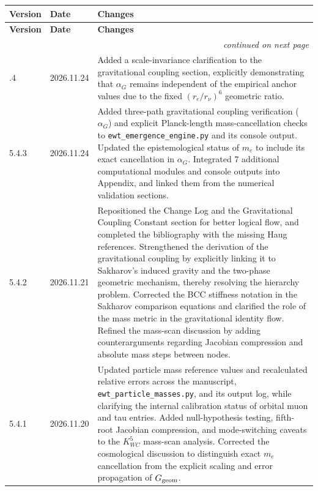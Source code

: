 \documentclass[10pt,a4paper]{article}
\begin{document}
\begin{longtable}{@{}p{1.6cm}p{1.8cm}p{10.1cm}@{}}
	\toprule
	\textbf{Version} & \textbf{Date} & \textbf{Changes} \\
	\midrule
	\endfirsthead
	
	\toprule
	\textbf{Version} & \textbf{Date} & \textbf{Changes} \\
	\midrule
	\endhead
	
	\midrule
	\multicolumn{3}{r}{\small\textit{continued on next page}} \\
	\endfoot
	
	\bottomrule
	\endlastfoot
	5.4.4 & 2026.11.24 &
	Added a scale-invariance clarification to the gravitational coupling section, explicitly demonstrating that \(\alpha_G\) remains independent of the empirical anchor values due to the fixed \((r_e/r_\nu)^6\) geometric ratio. \\
	5.4.3 & 2026.11.24 &
	Added three-path gravitational coupling verification (\(\alpha_G\)) and explicit Planck-length mass-cancellation checks to \texttt{ewt\_emergence\_engine.py} and its console output. Updated the epistemological status of \(m_e\) to include its exact cancellation in \(\alpha_G\). Integrated 7 additional computational modules and console outputs into Appendix, and linked them from the numerical validation sections.\\
	5.4.2 & 2026.11.21 &
	Repositioned the Change Log and the Gravitational Coupling Constant section for better logical flow, and completed the bibliography with the missing Haug references. Strengthened the derivation of the gravitational coupling by explicitly linking it to Sakharov's induced gravity and the two-phase geometric mechanism, thereby resolving the hierarchy problem. Corrected the BCC stiffness notation in the Sakharov comparison equations and clarified the role of the mass metric in the gravitational identity flow. Refined the mass-scan discussion by adding counterarguments regarding Jacobian compression and absolute mass steps between nodes. \\
	5.4.1 & 2026.11.20 &
	Updated particle mass reference values and recalculated relative errors 
	across the manuscript, \texttt{ewt\_particle\_masses.py}, and its output 
	log, while clarifying the internal calibration status of orbital muon and 
	tau entries. Added null-hypothesis testing, fifth-root Jacobian compression, 
	and mode-switching caveats to the \(K_{WC}^5\) mass-scan analysis. 
	Corrected the cosmological discussion to distinguish exact \(m_e\) 
	cancellation from the explicit scaling and error propagation of \(G_{\rm geom}\). \\

\end{longtable}
\end{document}
